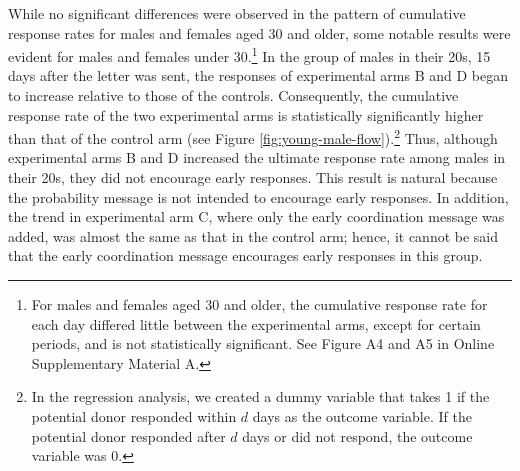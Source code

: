 \documentclass[12pt, a4paper]{article}
\begin{document}
While no significant differences were observed in the pattern of cumulative response rates for males and females aged 30 and older, some notable results were evident for males and females under 30.\footnote{For males and females aged 30 and older, the cumulative response rate for each day differed little between the experimental arms, except for certain periods, and is not statistically significant. See Figure A4 and A5 in Online Supplementary Material A.} In the group of males in their 20s, 15 days after the letter was sent, the responses of experimental arms B and D began to increase relative to those of the controls. Consequently, the cumulative response rate of the two experimental arms is statistically significantly higher than that of the control arm (see Figure \ref{fig:young-male-flow}).\footnote{In the regression analysis, we created a dummy variable that takes 1 if the potential donor responded within \(d\) days as the outcome variable. If the potential donor responded after \(d\) days or did not respond, the outcome variable was 0.} Thus, although experimental arms B and D increased the ultimate response rate among males in their 20s, they did not encourage early responses. This result is natural because the probability message is not intended to encourage early responses. In addition, the trend in experimental arm C, where only the early coordination message was added, was almost the same as that in the control arm; hence, it cannot be said that the early coordination message encourages early responses in this group.
\end{document}

